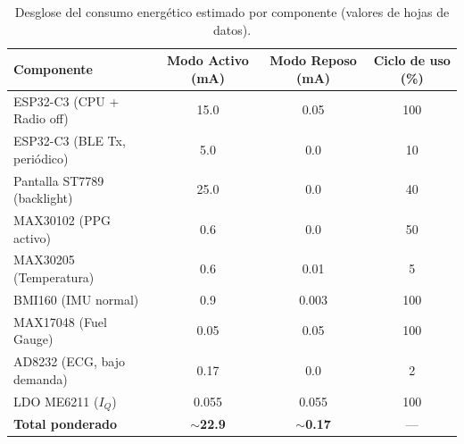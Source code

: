 \documentclass[letterpaper,11pt]{article}
\begin{document}
\begin{table}[H]
    \centering
    \renewcommand{\arraystretch}{1.3}
    \begin{tabular}{|L{4cm}|c|c|c|}
        \hline
        \textbf{Componente}          & \textbf{Modo Activo (mA)} & \textbf{Modo Reposo (mA)} & \textbf{Ciclo de uso (\%)} \\ \hline
        ESP32-C3 (CPU + Radio off) \citep{esp32c3_ds}   & 15.0                       & 0.05                       & 100                         \\ \hline
        ESP32-C3 (BLE Tx, periódico) \citep{esp32c3_ds} & 5.0                        & 0.0                        & 10                          \\ \hline
        Pantalla ST7789 (backlight) \citep{st7789_ds}  & 25.0                       & 0.0                        & 40                          \\ \hline
        MAX30102 (PPG activo) \citep{max30102_ds}        & 0.6                        & 0.0                        & 50                          \\ \hline
        MAX30205 (Temperatura) \citep{max30205_ds}       & 0.6                        & 0.01                       & 5                           \\ \hline
        BMI160 (IMU normal) \citep{bmi160_ds}          & 0.9                        & 0.003                      & 100                         \\ \hline
        MAX17048 (Fuel Gauge) \citep{max17048_ds}        & 0.05                       & 0.05                       & 100                         \\ \hline
        AD8232 (ECG, bajo demanda) \citep{ad8232_ds}   & 0.17                       & 0.0                        & 2                           \\ \hline
        LDO ME6211 ($I_Q$) \citep{me6211_ds}           & 0.055                      & 0.055                      & 100                         \\ \hline
        \textbf{Total ponderado}     & \textbf{$\sim$22.9}        & \textbf{$\sim$0.17}        & ---                         \\ \hline
    \end{tabular}
    \caption{Desglose del consumo energético estimado por componente (valores de hojas de datos).}
    \label{tab:consumo}
\end{table}
\end{document}
